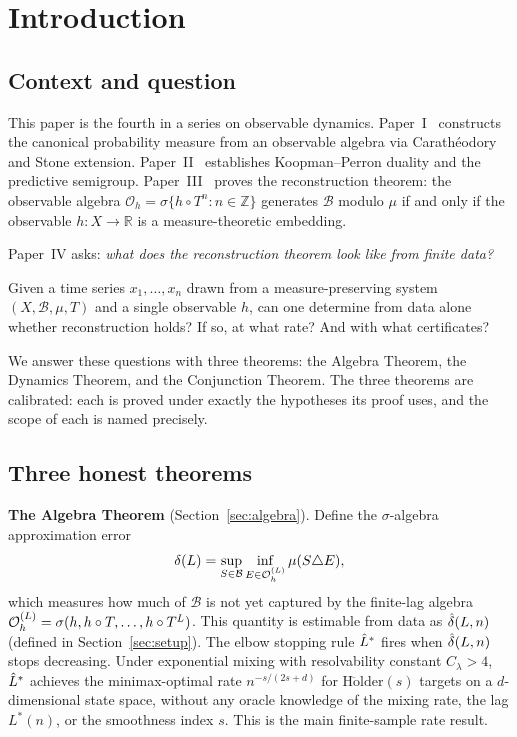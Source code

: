\section{Introduction}
\label{sec:intro}

\subsection{Context and question}

This paper is the fourth in a series on observable dynamics.
Paper~I~\cite{mahon_paper1} constructs the canonical probability measure from
an observable algebra via Carathéodory and Stone extension.
Paper~II~\cite{mahon_paper2} establishes Koopman--Perron duality and the
predictive semigroup.
Paper~III~\cite{mahon_paper3} proves the reconstruction theorem: the
observable algebra $\mathcal{O}_h = \sigma\{h \circ T^n : n \in \mathbb{Z}\}$
generates $\mathcal{B}$ modulo $\mu$ if and only if the observable
$h : X \to \mathbb{R}$ is a measure-theoretic embedding.

Paper~IV asks: \emph{what does the reconstruction theorem look like from
finite data?}

Given a time series $x_1, \ldots, x_n$ drawn from a measure-preserving
system $(X, \mathcal{B}, \mu, T)$ and a single observable $h$, can one
determine from data alone whether reconstruction holds?
If so, at what rate?
And with what certificates?

We answer these questions with three theorems: the Algebra Theorem, the
Dynamics Theorem, and the Conjunction Theorem.
The three theorems are calibrated: each is proved under exactly the
hypotheses its proof uses, and the scope of each is named precisely.

\subsection{Three honest theorems}

\textbf{The Algebra Theorem} (Section~\ref{sec:algebra}).
Define the $\sigma$-algebra approximation error
\[ \delta(L) = \sup_{S \in \mathcal{B}} \inf_{E \in \mathcal{O}_h^{(L)}} \mu(S \triangle E),\]
which measures how much of $\mathcal{B}$ is not yet captured by the
finite-lag algebra $\mathcal{O}_h^{(L)} = \sigma(h, h\circ T, \ldots, h \circ T^L)$.
This quantity is estimable from data as $\hat{\delta}(L,n)$ (defined
in Section~\ref{sec:setup}).
The elbow stopping rule $\hat{L}^*$ fires when $\hat{\delta}(L,n)$ stops decreasing.
Under exponential mixing with resolvability constant $C_\lambda > 4$,
$\hat{L}^*$ achieves the minimax-optimal rate $n^{-s/(2s+d)}$ for
$\mathrm{H\ddot{o}lder}(s)$ targets on a $d$-dimensional state space,
without any oracle knowledge of the mixing rate, the lag $L^*(n)$,
or the smoothness index $s$.
This is the main finite-sample rate result.

